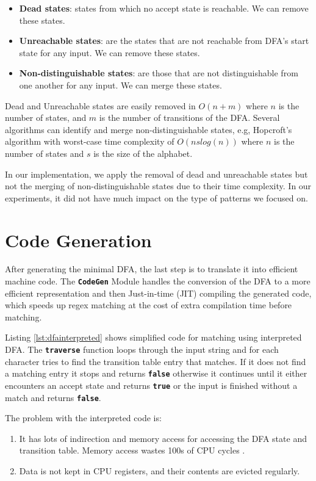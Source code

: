 \begin{itemize}
    \item \textbf{Dead states}: states from which no accept state is reachable. We can remove these states.
    \item  \textbf{Unreachable states}: are the states that are not reachable from DFA's start state for any input. We can remove these states.
    \item \textbf{Non-distinguishable states}: are those that are not distinguishable from one another for any input. We can merge these states.
\end{itemize}

Dead and Unreachable states are easily removed in $O(n + m)$ where $n$ is the number of states, and $m$ is the number of transitions of the DFA. Several algorithms can identify and merge non-distinguishable states, e.g, Hopcroft's algorithm \cite{Hopcroftalgo} with worst-case time complexity of $O(ns log(n))$ where $n$ is the number of states and $s$ is the size of the alphabet.

In our implementation, we apply the removal of dead and unreachable states but not the merging of non-distinguishable states due to their time complexity. In our experiments, it did not have much impact on the type of patterns we focused on.

\section{Code Generation}
After generating the minimal DFA, the last step is to translate it into efficient machine code. The \texttt{\textbf{CodeGen}} Module handles the conversion of the DFA to a more efficient representation and then Just-in-time (JIT) compiling the generated code, which speeds up regex matching at the cost of extra compilation time before matching.

Listing \ref{lst:dfainterpreted} shows simplified code for matching using interpreted DFA. The \texttt{\textbf{traverse}} function loops through the input string and for each character tries to find the transition table entry that matches. If it does not find a matching entry it stops and returns \texttt{\textbf{false}} otherwise it continues until it either encounters an accept state and returns \texttt{\textbf{true}} or the input is finished without a match and returns \texttt{\textbf{false}}.

The problem with the interpreted code is:
\begin{enumerate}
    \item It has lots of indirection and memory access for accessing the DFA state and transition table. Memory access wastes 100s of CPU cycles \cite{cpumemgap}.
    \item Data is not kept in CPU registers, and their contents are evicted regularly.
\end{enumerate}

